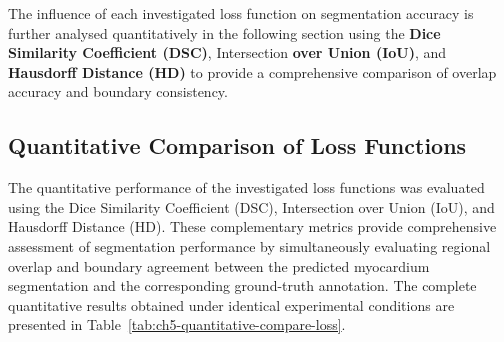 The influence of each investigated loss function on segmentation accuracy is further analysed quantitatively in the following section using the \textbf{Dice Similarity Coefficient (DSC)}, Intersection \textbf{over Union (IoU)}, and \textbf{Hausdorff Distance (HD)} to provide a comprehensive comparison of overlap accuracy and boundary consistency.

\subsection{Quantitative Comparison of Loss Functions}
\label{subsec:ch5-quantitative-compare-loss}

The quantitative performance of the investigated loss functions was evaluated using the Dice Similarity Coefficient (DSC), Intersection over Union (IoU), and Hausdorff Distance (HD). These complementary metrics provide comprehensive assessment of segmentation performance by simultaneously evaluating regional overlap and boundary agreement between the predicted myocardium segmentation and the corresponding ground-truth annotation. The complete quantitative results obtained under identical experimental conditions are presented in Table~\ref{tab:ch5-quantitative-compare-loss}.


